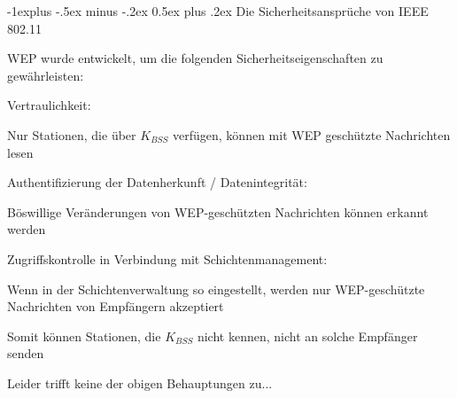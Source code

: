 \documentclass[a4paper]{article}
\makeatletter
\renewcommand{\subsection}{\@startsection{subsection}{2}{0mm}%
 {-1explus -.5ex minus -.2ex}%
 {0.5ex plus .2ex}%
 {\normalfont\normalsize\bfseries}}
\makeatother
\begin{document}
\begin{multicols}{3}
      \subsection{Die Sicherheitsansprüche von IEEE 802.11}
      \begin{itemize*}
            \item WEP wurde entwickelt, um die folgenden Sicherheitseigenschaften zu gewährleisten:
            \begin{itemize*}
                  \item Vertraulichkeit:
                  \begin{itemize*}
                        \item Nur Stationen, die über $K_{BSS}$ verfügen, können mit WEP geschützte Nachrichten lesen
                  \end{itemize*}
                  \item Authentifizierung der Datenherkunft / Datenintegrität:
                  \begin{itemize*}
                        \item Böswillige Veränderungen von WEP-geschützten Nachrichten können erkannt werden
                  \end{itemize*}
                  \item Zugriffskontrolle in Verbindung mit Schichtenmanagement:
                  \begin{itemize*}
                        \item Wenn in der Schichtenverwaltung so eingestellt, werden nur WEP-geschützte Nachrichten von Empfängern akzeptiert
                        \item Somit können Stationen, die $K_{BSS}$ nicht kennen, nicht an solche Empfänger senden
                  \end{itemize*}
            \end{itemize*}
            \item Leider trifft keine der obigen Behauptungen zu...
      \end{itemize*}


\end{multicols}
\end{document}
